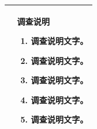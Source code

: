 \documentclass[UTF8,10pt,a4paper,fontset=fandol]{ctexart}
\newcommand{\fieldvalue}[1]{#1}
\newcommand{\handwritten}[1]{#1}
\begin{document}
\begin{tabularx}{\textwidth}{|p{}|X|}
\begin{minipage}[t]{0.46\textwidth}
\fieldvalue{\handwritten{\checkmark}}\quad

\fieldvalue{\handwritten{\checkmark}}\quad

\fieldvalue{\handwritten{\checkmark}}\quad

\fieldvalue{\handwritten{\checkmark}}\quad

\fieldvalue{\handwritten{\checkmark}}\quad

\fieldvalue{\handwritten{\checkmark}}\quad

\fieldvalue{\handwritten{\checkmark}}\quad

\fieldvalue{\handwritten{\checkmark}}\quad

\fieldvalue{\handwritten{\checkmark}}\quad

\fieldvalue{\handwritten{\checkmark}}\quad

\fieldvalue{\handwritten{\checkmark}}\quad
\end{minipage}
&
\begin{minipage}[t]{0.48\textwidth}
\textbf{调查说明}

\begin{enumerate}
\item
调查说明文字。

\item
调查说明文字。

\item
调查说明文字。

\item
调查说明文字。

\item
调查说明文字。
\end{enumerate}
\end{minipage}
\\
\hline
\end{tabularx}
\end{document}

